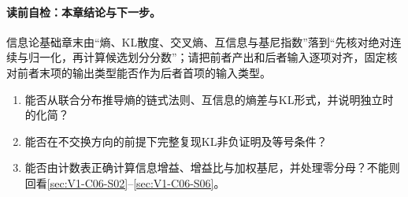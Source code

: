 \label{struct:V1-C06-CH36}
\paragraph{读前自检：本章结论与下一步。}信息论基础章末由“熵、KL散度、交叉熵、互信息与基尼指数”落到“先核对绝对连续与归一化，再计算候选划分分数”；请把前者产出和后者输入逐项对齐，固定核对前者末项的输出类型能否作为后者首项的输入类型。\par

\begin{SLCompactClosure}

\label{struct:V1-C06-CH37}
\begin{selfcheckbox}
\begin{enumerate}[leftmargin=2.2em]
  \item 能否从联合分布推导熵的链式法则、互信息的熵差与KL形式，并说明独立时的化简？
  \item 能否在不交换方向的前提下完整复现KL非负证明及等号条件？
  \item 能否由计数表正确计算信息增益、增益比与加权基尼，并处理零分母？不能则回看\cref{sec:V1-C06-S02}--\cref{sec:V1-C06-S06}。
\end{enumerate}
\end{selfcheckbox}
\end{SLCompactClosure}
